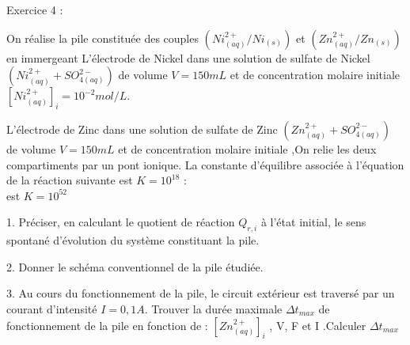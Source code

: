\documentclass[12pt, french]{article}
\begin{document}
\begin{Box2}{Exercice 4 : }

	On réalise la pile constituée des couples $(Ni^{2+}_{(aq)}/Ni_(s))$ et $(Zn^{2+}_{(aq)}/Zn_{(s)})$ en immergeant L’électrode de Nickel dans une solution de sulfate de Nickel $(Ni^{2+}_{(aq)} + SO^{2-}_{4(aq)})$ de 
volume $V = 150 mL$ et de concentration molaire initiale $[Ni^{2+}_{(aq)}]_i=10^{-2} mol/L$.


L’électrode de Zinc dans une solution de sulfate de Zinc $(Zn^{2+}_{(aq)} +SO^{2-}_{4(aq)})$
de volume $V = 150 mL$ et de concentration molaire initiale ,On relie les deux compartiments par un pont ionique. La constante d’équilibre associée à l’équation de la réaction suivante est $K=10^{18}$ : \\ est $K = 10^{52}$

	1. Préciser, en calculant le quotient de réaction $Q_{r,i}$ à l’état initial, le sens spontané
d’évolution du système constituant la pile.

2. Donner le schéma conventionnel de la pile étudiée.

3. Au cours du fonctionnement de la pile, le circuit extérieur est traversé par un
courant d’intensité $I = 0,1 A$. Trouver la durée maximale $\Delta{t}_{max}$ de fonctionnement de la pile en fonction de : $[Zn^{2+}_{(aq)}]_i$ , V, F et I .Calculer $\Delta{t}_{max}$


\end{Box2}













\end{document}
